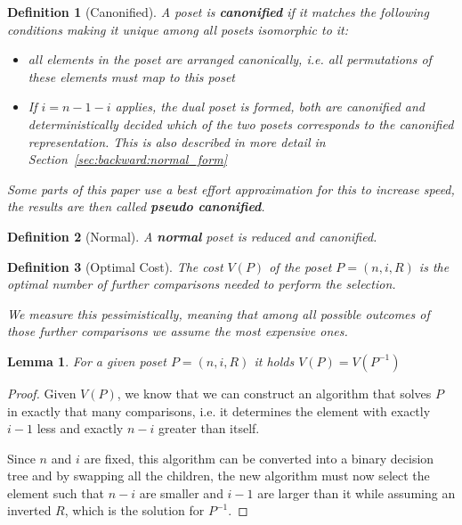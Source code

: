 \documentclass[10pt,journal,compsoc]{IEEEtran}
\newtheorem{lemma}{Lemma}
\newtheorem{definition}{Definition}
\begin{document}
\begin{definition}[Canonified]
  A poset is \textbf{canonified} if it matches the following conditions making it unique among all posets isomorphic to it:
  \begin{itemize}
    \item all elements in the poset are arranged canonically, i.e. all permutations of these elements must map to this poset
    \item
          If $i = n - 1 - i$ applies, the dual poset is formed, both are canonified and deterministically decided which of the two posets corresponds to the canonified representation.
          This is also described in more detail in Section~\ref{sec:backward:normal_form}
  \end{itemize}

  Some parts of this paper use a best effort approximation for this to increase speed, the results are then called \textbf{pseudo canonified}.
\end{definition}

\begin{definition}[Normal]
  A \textbf{normal} poset is reduced and canonified.
\end{definition}

\begin{definition}[Optimal Cost]
  The cost $V(P)$ of the poset $P = (n, i, R)$ is the optimal number of further comparisons needed to perform the selection.

  We measure this pessimistically, meaning that among all possible outcomes of those further comparisons we assume the most expensive ones.
\end{definition}

\begin{lemma} \label{lemma:dual_poset_allowed}
  For a given poset $P = (n, i, R)$ it holds $V(P) = V(P^{-1})$
\end{lemma}

\begin{proof}
  Given $V(P)$, we know that we can construct an algorithm that solves $P$ in exactly that many comparisons, i.e. it determines the element with exactly $i - 1$ less and exactly $n - i$ greater than itself.

  Since $n$ and $i$ are fixed, this algorithm can be converted into a binary decision tree and by swapping all the children, the new algorithm must now select the element such that $n - i$ are smaller and $i - 1$ are larger than it while assuming an inverted $R$, which is the solution for $P^{-1}$.
\end{proof}
\end{document}
